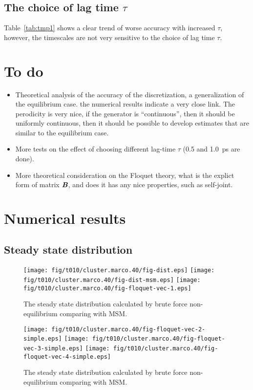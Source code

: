 \documentclass[aps, pre, preprint,unsortedaddress,a4paper,onecolumn]{revtex4-1}
\newcommand{\vect}[1]{\textbf{\textit{#1}}}
\begin{document}
\subsection{The choice of lag time $\tau$}
Table~\ref{tab:tmp1} shows a clear trend of worse accuracy with
increased $\tau$, however, the timescales are not very sensitive to
the choice of lag time $\tau$.

\section{To do}

\begin{itemize}
\item Theoretical analysis of the accuracy of the discretization, a
generalization of the equilibrium case. the numerical results indicate
a very close link. The perodicity is very nice, if the generator is
``continuous'', then it should be uniformly continuous, then it should
be possible to develop estimates that are similar to the equilibrium
case.
\item More tests on the effect of choosing different lag-time $\tau$ (0.5 and 1.0~ps are done).
\item More theoretical consideration on the Floquet theory, what is the
explict form of matrix $\vect B$, and does it has any nice properties,
such as self-joint.
\end{itemize}


\section{Numerical results}
\subsection{Steady state distribution}
\begin{figure}
  \centering  
  \texttt{[image: fig/t010/cluster.marco.40/fig-dist.eps]}
  \texttt{[image: fig/t010/cluster.marco.40/fig-dist-msm.eps]}
  \texttt{[image: fig/t010/cluster.marco.40/fig-floquet-vec-1.eps]}
  \caption{The steady state distribution calculated by brute force non-equilibrium comparing with MSM.}
  \label{fig:num-1}
\end{figure}
\begin{figure}
  \centering  
  \texttt{[image: fig/t010/cluster.marco.40/fig-floquet-vec-2-simple.eps]}
  \texttt{[image: fig/t010/cluster.marco.40/fig-floquet-vec-3-simple.eps]}
  \texttt{[image: fig/t010/cluster.marco.40/fig-floquet-vec-4-simple.eps]}
  \caption{The steady state distribution calculated by brute force non-equilibrium comparing with MSM.}
  \label{fig:num-2}
\end{figure}
\end{document}

